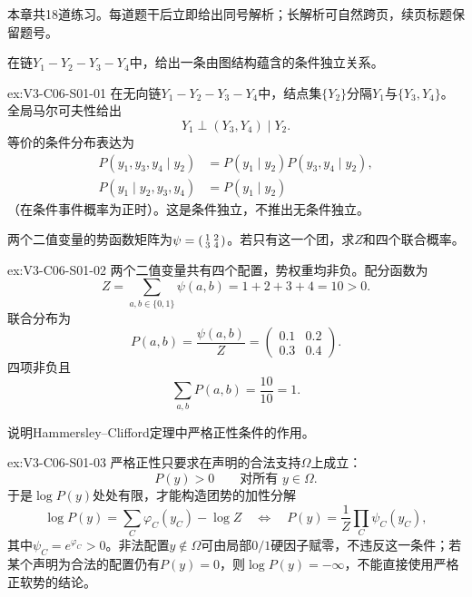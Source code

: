 \label{struct:V3-C06-CH34}
\begin{chapterexercisebox}
\label{struct:V3-C06-CH35}
本章共18道练习。每道题干后立即给出同号解析；长解析可自然跨页，续页标题保留题号。
\end{chapterexercisebox}

\begin{SLChapterExercisePairSection}

\begin{exercise}\label{ex:V3-C06-S01-01}
在链$Y_1-Y_2-Y_3-Y_4$中，给出一条由图结构蕴含的条件独立关系。
\end{exercise}
\ifSLFullEdition
{}\label{sol:V3-C06-S01-01}
\begin{chapterexercisesolution}{ex:V3-C06-S01-01}
在无向链$Y_1-Y_2-Y_3-Y_4$中，结点集$\{Y_2\}$分隔$Y_1$与$\{Y_3,Y_4\}$。全局马尔可夫性给出
\[
Y_1\perp(Y_3,Y_4)\mid Y_2.
\]
等价的条件分布表达为
\[
\begin{aligned}
P(y_1,y_3,y_4\mid y_2)
  &=P(y_1\mid y_2)P(y_3,y_4\mid y_2),\\
P(y_1\mid y_2,y_3,y_4)
  &=P(y_1\mid y_2)
\end{aligned}
\]
（在条件事件概率为正时）。这是条件独立，不推出无条件独立。
\end{chapterexercisesolution}
\fi

\begin{exercise}\label{ex:V3-C06-S01-02}
两个二值变量的势函数矩阵为$\psi=\begin{psmallmatrix}1&2\\3&4\end{psmallmatrix}$。若只有这一个团，求$Z$和四个联合概率。
\end{exercise}
\ifSLFullEdition
{}\label{sol:V3-C06-S01-02}
\begin{chapterexercisesolution}{ex:V3-C06-S01-02}
两个二值变量共有四个配置，势权重均非负。配分函数为
\[
Z=\sum_{a,b\in\{0,1\}}\psi(a,b)=1+2+3+4=10>0.
\]
联合分布为
\[
P(a,b)=\frac{\psi(a,b)}{Z}
=\begin{pmatrix}0.1&0.2\\0.3&0.4\end{pmatrix}.
\]
四项非负且
\[
\sum_{a,b}P(a,b)=\frac{10}{10}=1.
\]
\end{chapterexercisesolution}
\fi

\begin{exercise}\label{ex:V3-C06-S01-03}
说明Hammersley--Clifford定理中严格正性条件的作用。
\end{exercise}
\ifSLFullEdition
{}\label{sol:V3-C06-S01-03}
\begin{chapterexercisesolution}{ex:V3-C06-S01-03}
严格正性只要求在声明的合法支持$\Omega$上成立：
\[
P(y)>0\qquad\text{对所有 }y\in\Omega.
\]
于是$\log P(y)$处处有限，才能构造团势的加性分解
\[
\log P(y)=\sum_{C}\varphi_C(y_C)-\log Z
\quad\Longleftrightarrow\quad
P(y)=\frac1Z\prod_C\psi_C(y_C),
\]
其中$\psi_C=e^{\varphi_C}>0$。非法配置$y\notin\Omega$可由局部$0/1$硬因子赋零，不违反这一条件；若某个声明为合法的配置仍有$P(y)=0$，则$\log P(y)=-\infty$，不能直接使用严格正软势的结论。
\end{chapterexercisesolution}
\fi


\end{SLChapterExercisePairSection}
